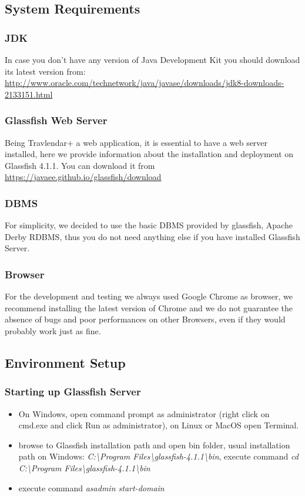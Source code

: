 \subsection{System Requirements}

\subsubsection{JDK}
In case you don't have any version of Java Development Kit you should download its latest version from:
\\
\href{url}{http://www.oracle.com/technetwork/java/javase/downloads/jdk8-downloads-2133151.html}

\subsubsection{Glassfish Web Server}
Being Travlendar+ a web application, it is essential to have a web server installed, here we provide information about the installation and deployment on Glassfish 4.1.1. You can download it from
\\
\href{url}{https://javaee.github.io/glassfish/download}

\subsubsection{DBMS}
For simplicity, we decided to use the basic DBMS provided by glassfish, Apache Derby RDBMS, thus you do not need anything else if you have installed Glassfish Server.

\subsubsection{Browser}
For the development and testing we always used Google Chrome as browser, we recommend installing the latest version of Chrome and we do not guarantee the absence of bugs and poor performances on other Browsers, even if they would probably work just as fine.

\subsection{Environment Setup}
\subsubsection{Starting up Glassfish Server}
\begin{itemize}
\item On Windows, open command prompt as administrator (right click on cmd.exe and click Run as administrator), on Linux or MacOS open Terminal.
\item browse to Glassfish installation path and open bin folder, usual installation path on Windows: \textit{C:\textbackslash Program Files\textbackslash glassfish-4.1.1\textbackslash bin}, execute command \textit{cd C:\textbackslash Program Files\textbackslash glassfish-4.1.1\textbackslash bin}
\item execute command \textit{asadmin start-domain}
\end{itemize}

